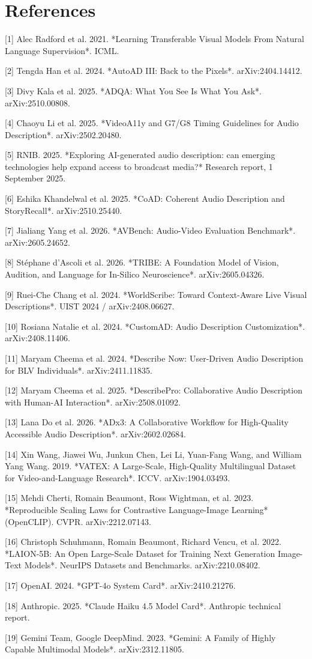 \documentclass[10pt,twocolumn]{article}
\begin{document}
\section*{References}

[1] Alec Radford et al. 2021. *Learning Transferable Visual Models From Natural Language Supervision*. ICML.


[2] Tengda Han et al. 2024. *AutoAD III: Back to the Pixels*. arXiv:2404.14412.


[3] Divy Kala et al. 2025. *ADQA: What You See Is What You Ask*. arXiv:2510.00808.


[4] Chaoyu Li et al. 2025. *VideoA11y and G7/G8 Timing Guidelines for Audio Description*. arXiv:2502.20480.


[5] RNIB. 2025. *Exploring AI-generated audio description: can emerging technologies help expand access to broadcast media?* Research report, 1 September 2025.


[6] Eshika Khandelwal et al. 2025. *CoAD: Coherent Audio Description and StoryRecall*. arXiv:2510.25440.


[7] Jialiang Yang et al. 2026. *AVBench: Audio-Video Evaluation Benchmark*. arXiv:2605.24652.


[8] Stéphane d'Ascoli et al. 2026. *TRIBE: A Foundation Model of Vision, Audition, and Language for In-Silico Neuroscience*. arXiv:2605.04326.


[9] Ruei-Che Chang et al. 2024. *WorldScribe: Toward Context-Aware Live Visual Descriptions*. UIST 2024 / arXiv:2408.06627.


[10] Rosiana Natalie et al. 2024. *CustomAD: Audio Description Customization*. arXiv:2408.11406.


[11] Maryam Cheema et al. 2024. *Describe Now: User-Driven Audio Description for BLV Individuals*. arXiv:2411.11835.


[12] Maryam Cheema et al. 2025. *DescribePro: Collaborative Audio Description with Human-AI Interaction*. arXiv:2508.01092.


[13] Lana Do et al. 2026. *ADx3: A Collaborative Workflow for High-Quality Accessible Audio Description*. arXiv:2602.02684.


[14] Xin Wang, Jiawei Wu, Junkun Chen, Lei Li, Yuan-Fang Wang, and William Yang Wang. 2019. *VATEX: A Large-Scale, High-Quality Multilingual Dataset for Video-and-Language Research*. ICCV. arXiv:1904.03493.


[15] Mehdi Cherti, Romain Beaumont, Ross Wightman, et al. 2023. *Reproducible Scaling Laws for Contrastive Language-Image Learning* (OpenCLIP). CVPR. arXiv:2212.07143.


[16] Christoph Schuhmann, Romain Beaumont, Richard Vencu, et al. 2022. *LAION-5B: An Open Large-Scale Dataset for Training Next Generation Image-Text Models*. NeurIPS Datasets and Benchmarks. arXiv:2210.08402.


[17] OpenAI. 2024. *GPT-4o System Card*. arXiv:2410.21276.


[18] Anthropic. 2025. *Claude Haiku 4.5 Model Card*. Anthropic technical report.


[19] Gemini Team, Google DeepMind. 2023. *Gemini: A Family of Highly Capable Multimodal Models*. arXiv:2312.11805.
\end{document}
